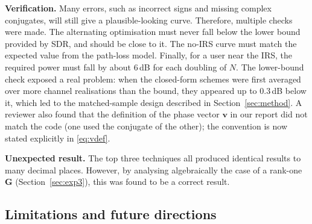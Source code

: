 \documentclass[11pt,a4paper]{article}
\newcommand{\Gm}{\bm{G}}
\newcommand{\vvec}{\bm{v}}
\begin{document}
\textbf{Verification.} Many errors, such as incorrect signs and missing complex conjugates, will still
give a plausible-looking curve. Therefore, multiple checks were made. The alternating optimisation
must never fall below the lower bound provided by SDR, and should be close to it. The no-IRS curve must
match the expected value from the path-loss model. Finally, for a user near the IRS, the required power
must fall by about 6\,dB for each doubling of $N$. The lower-bound check exposed a real problem: when the closed-form schemes were first averaged over
more channel realisations than the bound, they appeared up to 0.3\,dB below it, which led to the
matched-sample design described in Section~\ref{sec:method}. A reviewer also found that the definition of the
phase vector $\vvec$ in our report did not match the code (one used the conjugate of the other);
the convention is now stated explicitly in \eqref{eq:vdef}.

\textbf{Unexpected result.} The top three techniques all produced identical results to many decimal
places. However, by analysing algebraically the case of a rank-one $\Gm$
(Section~\ref{sec:exp3}), this was found to be a correct result.

\subsection{Limitations and future directions}
\label{sec:limits}
\end{document}

